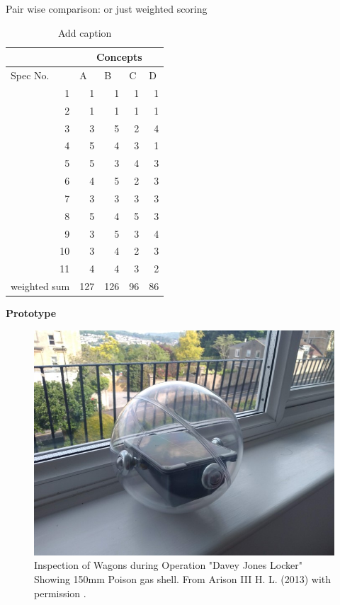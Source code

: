 Pair wise comparison: or just weighted scoring

\begin{table}[htbp]
  \centering
  \caption{Add caption}
    \begin{tabular}{lrrrr}
          & \multicolumn{4}{c}{Concepts} \\
\hline
    Spec No. & \multicolumn{1}{l}{A} & \multicolumn{1}{l}{B} & \multicolumn{1}{l}{C} & \multicolumn{1}{l}{D} \\
\hline
    \multicolumn{1}{r}{1} & 1     & 1     & 1     & 1 \\
    \multicolumn{1}{r}{2} & 1     & 1     & 1     & 1 \\
    \multicolumn{1}{r}{3} & 3     & 5     & 2     & 4 \\
    \multicolumn{1}{r}{4} & 5     & 4     & 3     & 1 \\
    \multicolumn{1}{r}{5} & 5     & 3     & 4     & 3 \\
    \multicolumn{1}{r}{6} & 4     & 5     & 2     & 3 \\
    \multicolumn{1}{r}{7} & 3     & 3     & 3     & 3 \\
    \multicolumn{1}{r}{8} & 5     & 4     & 5     & 3 \\
    \multicolumn{1}{r}{9} & 3     & 5     & 3     & 4 \\
    \multicolumn{1}{r}{10} & 3     & 4     & 2     & 3 \\
    \multicolumn{1}{r}{11} & 4     & 4     & 3     & 2 \\
    weighted sum & \cellcolor[rgb]{ .388,  .745,  .482}127 & \cellcolor[rgb]{ .427,  .757,  .486}126 & \cellcolor[rgb]{ .98,  .616,  .459}96 & \cellcolor[rgb]{ .973,  .412,  .42}86 \\
\hline
    \end{tabular}%
  \label{tab:addlabel}%
\end{table}%





\textbf{Prototype}\\

\begin{figure}[H]
\centering
\includegraphics[width=0.5\linewidth]{Engineering_hardware/Engineering_hardware_Figures/airm1.JPG}
\caption{Inspection of Wagons during Operation "Davey Jones Locker" Showing 150mm Poison gas shell. From Arison III H. L. (2013) with permission \cite{arison2014european}.  }
\label{fig:15cm_shell_loading}
\end{figure}


